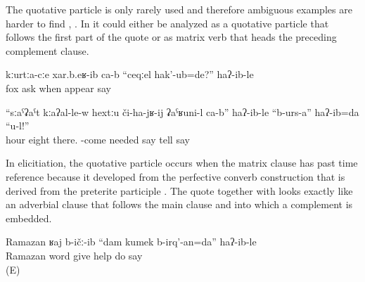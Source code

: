 The quotative particle  is only rarely used and therefore ambiguous examples are harder to find , . In  it could either be analyzed as a quotative particle that follows the first part of the quote or as matrix verb that heads the preceding complement clause.
%
\begin{exe}
	\ex	\label{ex:They asked the fox, When were you born?, ...}
	\gll	kːurtːa-cːe	xar.b.eʁ-ib	ca-b	``ceqːel	hak'-ub=de?''	haʔ-ib-le\\
		fox	ask		when	appear	say\\
	\glt	{}

	\ex	\label{ex:‎‎‎It is necessary that he must come, at 8 he must be there, tell him this, I said}
	\gll	``sːaˁʡaˁt	kːaʔal-le-w	hextːu	či-ha-jʁ-ij	ʡaˁʁuni-l	ca-b''	haʔ-ib-le	``b-urs-a''	haʔ-ib=da	``u-l!''\\
		hour	eight	there.	-come	needed		say	tell	say	\\
	\glt	{}
\end{exe}

In elicitiation, the quotative particle  occurs when the matrix clause has past time reference because it developed from the perfective converb construction that is derived from the preterite participle . The quote together with  looks exactly like an adverbial clause that follows the main clause and into which a complement is embedded.
%
\begin{exe}
	\ex	\label{ex:‎‎‎Ramazan gave me his word, I'll help, he said}
	\gll	Ramazan	ʁaj	b-ičː-ib	``dam	kumek	b-irq'-an=da''	haʔ-ib-le\\
		Ramazan	word	give		help	do	say\\
	\glt	{} (E)
\end{exe}

